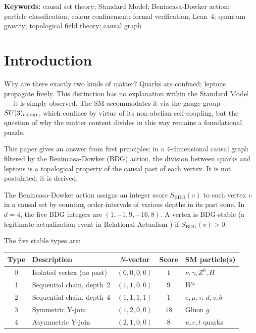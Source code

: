 \documentclass[11pt,a4paper]{article}
\newcommand{\SBDG}{S_{\mathrm{BDG}}}
\begin{document}
\medskip\noindent
\textbf{Keywords:} causal set theory; Standard Model; Benincasa-Dowker action; particle
classification; colour confinement; formal verification; Lean~4; quantum gravity; topological
field theory; causal graph

\section{Introduction}

Why are there exactly two kinds of matter?  Quarks are confined; leptons propagate freely.
This distinction has no explanation within the Standard Model --- it is simply observed.  The SM
accommodates it via the gauge group $SU(3)_{\rm colour}$, which confines by virtue of its
non-abelian self-coupling, but the question of why the matter content divides in this way remains
a foundational puzzle.

This paper gives an answer from first principles: in a 4-dimensional causal graph filtered by the
Benincasa-Dowker (BDG) action, the division between quarks and leptons is a topological property
of the causal past of each vertex.  It is not postulated; it is derived.

The Benincasa-Dowker action \citep{Benincasa2010,Dowker2013} assigns an integer score $\SBDG(v)$
to each vertex $v$ in a causal set by counting order-intervals of various depths in its past cone.
In $d=4$, the five BDG integers are $(1,-1,9,-16,8)$.  A vertex is BDG-stable (a legitimate
actualization event in Relational Actualism \citep{Sandeman2026RAQM}) if $\SBDG(v)>0$.

The five stable types are:
\begin{center}
\renewcommand{\arraystretch}{1.2}
\begin{tabular}{clccl}
\toprule
Type & Description & $N$-vector & Score & SM particle(s)\\
\midrule
0 & Isolated vertex (no past) & $(0,0,0,0)$ & $1$ & $\nu,\gamma,Z^0,H$\\
1 & Sequential chain, depth~2 & $(1,1,0,0)$ & $9$ & $W^\pm$\\
2 & Sequential chain, depth~4 & $(1,1,1,1)$ & $1$ & $e,\mu,\tau$; $d,s,b$\\
3 & Symmetric Y-join & $(1,2,0,0)$ & $18$ & Gluon $g$\\
4 & Asymmetric Y-join & $(2,1,0,0)$ & $8$ & $u,c,t$ quarks\\
\bottomrule
\end{tabular}
\end{center}
\end{document}
